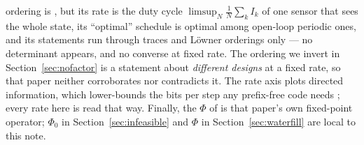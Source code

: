 ordering is \cite{shi2012scheduling}, but its rate is the duty cycle
$\limsup_N\frac1N\sum_k I_k$ of one sensor that sees the whole state, its ``optimal''
schedule is optimal among open-loop periodic ones, and its statements run through
traces and L\"owner orderings only --- no determinant appears, and no converse at
fixed rate. The ordering we invert in Section~\ref{sec:nofactor} is a statement about
\emph{different designs} at a fixed rate, so that paper neither corroborates nor
contradicts it. The rate axis plots directed information, which lower-bounds the bits per step any
prefix-free code needs \cite{tanaka2016prefix}; every rate here is read that way.
Finally, the $\Phi$ of \cite{pacelli2026limits} is that paper's own
fixed-point operator; $\Phi_0$ in Section~\ref{sec:infeasible} and $\Phi$ in
Section~\ref{sec:waterfill} are local to this note.
